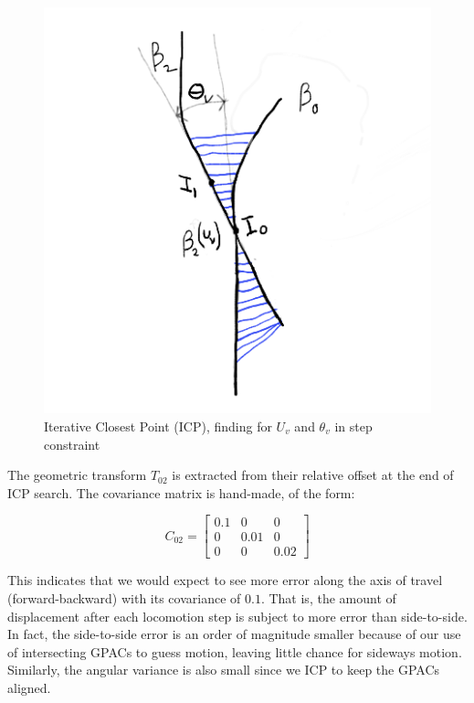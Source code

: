 \begin{figure}[htbp]
\centering
\includegraphics[keepaspectratio,width=400pt,height=0.75\textheight]{5_step_ICP.png}
\caption{Iterative Closest Point (ICP), finding for $U_v$ and $\theta_v$ in step constraint}
\label{fig:step_icp}
\end{figure}






The geometric transform $T_{02}$ is extracted from their relative offset at the end of ICP search. The covariance matrix is hand-made, of the form:


\begin{equation}
C_{02} = 
\begin{bmatrix}
0.1 & 0 & 0 \\
0 & 0.01 & 0 \\
0 & 0 & 0.02
\end{bmatrix}
\end{equation}


This indicates that we would expect to see more error along the axis of travel (forward-backward) with its covariance of $0.1$. That is, the amount of displacement after each locomotion step is subject to more error than side-to-side. In fact, the side-to-side error is an order of magnitude smaller because of our use of intersecting GPACs to guess motion, leaving little chance for sideways motion. Similarly, the angular variance is also small since we ICP to keep the GPACs aligned.

